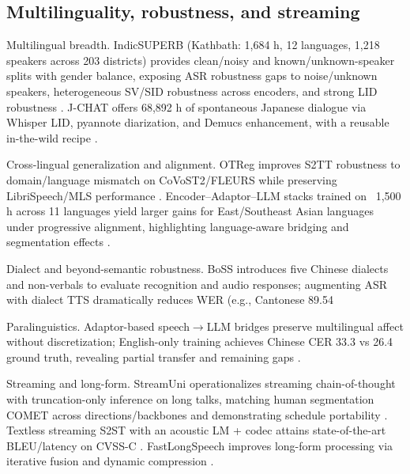 \documentclass{article}
\begin{document}
\subsection{Multilinguality, robustness, and streaming} \label{subsec:Multilinguality, robustness, and streaming}

Multilingual breadth. IndicSUPERB (Kathbath: 1,684 h, 12 languages, 1,218 speakers across 203 districts) provides clean/noisy and known/unknown-speaker splits with gender balance, exposing ASR robustness gaps to noise/unknown speakers, heterogeneous SV/SID robustness across encoders, and strong LID robustness \cite{entry2025indicsuperbspeechprocessinguniversalperf}. J-CHAT offers 68,892 h of spontaneous Japanese dialogue via Whisper LID, pyannote diarization, and Demucs enhancement, with a reusable in-the-wild recipe \cite{nakata2024jchatjapaneselargescalespokendialoguecor}.

Cross-lingual generalization and alignment. OTReg improves S2TT robustness to domain/language mismatch on CoVoST2/FLEURS while preserving LibriSpeech/MLS performance \cite{xu2025optimaltransportregularizationspeechtext}. Encoder--Adaptor--LLM stacks trained on ~1,500 h across 11 languages yield larger gains for East/Southeast Asian languages under progressive alignment, highlighting language-aware bridging and segmentation effects \cite{nguyen2025qwenvsgemmaintegrationwhispercomparative}.

Dialect and beyond-semantic robustness. BoSS introduces five Chinese dialects and non-verbals to evaluate recognition and audio responses; augmenting ASR with dialect TTS dramatically reduces WER (e.g., Cantonese 89.54%

Paralinguistics. Adaptor-based speech$\rightarrow$LLM bridges preserve multilingual affect without discretization; English-only training achieves Chinese CER 33.3 vs 26.4 ground truth, revealing partial transfer and remaining gaps \cite{wang2024blspemotowardsempatheticlargespeechlangu,zhu2024generativepretrainedspeechlanguagemodele}.

Streaming and long-form. StreamUni operationalizes streaming chain-of-thought with truncation-only inference on long talks, matching human segmentation COMET across directions/backbones and demonstrating schedule portability \cite{guo2025streamuniachievingstreamingspeechtransla}. Textless streaming S2ST with an acoustic LM + codec attains state-of-the-art BLEU/latency on CVSS-C \cite{zhao2024textlessstreamingspeechtranslationsemant}. FastLongSpeech improves long-form processing via iterative fusion and dynamic compression \cite{guo2025fastlongspeechenhancinglargespeechlangua}.
\end{document}
